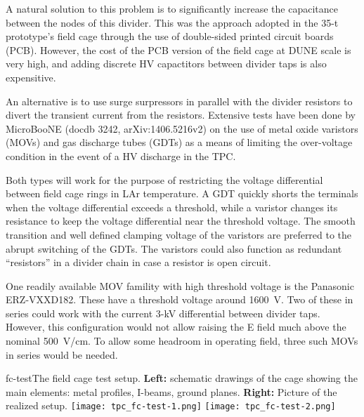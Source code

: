 A natural solution to this problem is to significantly increase the capacitance between the nodes of this divider. This was the approach adopted in the 35-t prototype's field cage through the use of double-sided printed circuit boards (PCB).  However, the cost of the PCB version of the field cage at DUNE scale is very high, and adding discrete HV capactitors between divider taps is also expensitive.

An alternative is to use surge surpressors in parallel with the divider resistors to divert the transient current from the resistors. Extensive tests have been done by MicroBooNE (docdb 3242, arXiv:1406.5216v2)  on the use of metal oxide varistors (MOVs) and gas discharge tubes (GDTs) as a means of limiting the over-voltage condition in the event of a HV discharge in the TPC. 

Both types will work for the purpose of restricting the voltage differential between field cage rings in LAr temperature. 
A GDT quickly shorts the terminals when the voltage differential exceeds a threshold, while
a varistor changes its resistance to keep the voltage differential near the threshold voltage.
The smooth transition and well defined clamping voltage of the varistors are preferred to the abrupt switching of the GDTs.
The varistors could also function as redundant ``resistors'' in a divider chain in case a resistor is open circuit. 

One readily available MOV famility  with high threshold voltage is the Panasonic ERZ-VXXD182.  These have a threshold voltage around 1600~V.  Two of these in series could work with the current 3-kV differential between divider taps.  However, this configuration would not allow raising the E field much above the nominal 500~V/cm.  To allow some headroom in operating field, three such MOVs in series would be needed.



\begin{cdrfigure}{fc-test}{The field cage test setup. 
 {\bf Left:} schematic drawings of the cage showing the main elements: metal profiles, I-beams, ground planes.
  {\bf Right:} Picture of the realized setup.}
\texttt{[image: tpc\_fc-test-1.png]}
\texttt{[image: tpc\_fc-test-2.png]}
\end{cdrfigure}


